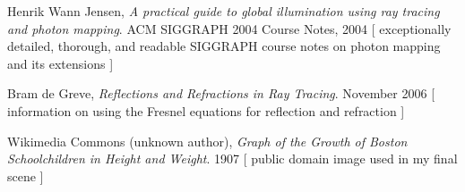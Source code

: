 \documentclass{article}
\begin{document}
\begin{thebibliography}{9}

 Henrik Wann Jensen,
 \emph{A practical guide to global illumination using ray tracing and photon mapping}.
 ACM SIGGRAPH 2004 Course Notes, 2004 [ exceptionally detailed, thorough, and readable SIGGRAPH course notes on photon mapping and its extensions ]

Bram de Greve, \emph{Reflections and Refractions in Ray Tracing}. November 2006
[ information on using the Fresnel equations for reflection and refraction ]

  Wikimedia Commons (unknown author), \emph{Graph of the Growth of Boston Schoolchildren in Height and Weight}. 1907 [ public domain image used in my final scene ]

\end{thebibliography}
\end{document}
